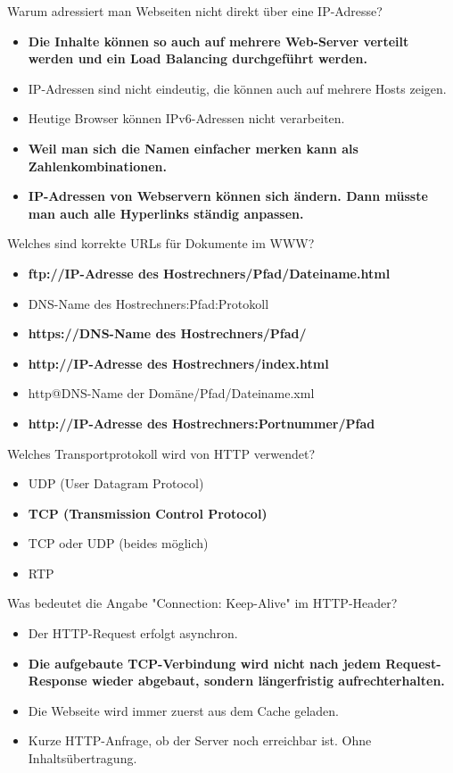 \documentclass{article}
\begin{document}
	Warum adressiert man Webseiten nicht direkt über eine IP-Adresse?
	\begin{itemize}
		\item \textbf{Die Inhalte können so auch auf mehrere Web-Server verteilt werden und ein Load Balancing durchgeführt werden.}
		\item IP-Adressen sind nicht eindeutig, die können auch auf mehrere Hosts zeigen.
		\item Heutige Browser können IPv6-Adressen nicht verarbeiten.
		\item \textbf{Weil man sich die Namen einfacher merken kann als Zahlenkombinationen.}
		\item \textbf{IP-Adressen von Webservern können sich ändern. Dann müsste man auch alle Hyperlinks ständig anpassen.}
	\end{itemize}

	Welches sind korrekte URLs für Dokumente im WWW? 
	\begin{itemize}
		\item \textbf{ftp://IP-Adresse des Hostrechners/Pfad/Dateiname.html}
		\item DNS-Name des Hostrechners:Pfad:Protokoll
		\item \textbf{https://DNS-Name des Hostrechners/Pfad/}
		\item \textbf{http://IP-Adresse des Hostrechners/index.html}
		\item http@DNS-Name der Domäne/Pfad/Dateiname.xml
		\item \textbf{http://IP-Adresse des Hostrechners:Portnummer/Pfad}
	\end{itemize}

	Welches Transportprotokoll wird von HTTP verwendet? 
	\begin{itemize}
		\item UDP (User Datagram Protocol) 
		\item \textbf{TCP (Transmission Control Protocol) }
		\item TCP oder UDP (beides möglich) 
		\item RTP
	\end{itemize}

	Was bedeutet die Angabe "Connection: Keep-Alive" im HTTP-Header? 
	\begin{itemize}
		\item Der HTTP-Request erfolgt asynchron.
		\item \textbf{Die aufgebaute TCP-Verbindung wird nicht nach jedem Request-Response wieder abgebaut, sondern längerfristig aufrechterhalten.} 
		\item Die Webseite wird immer zuerst aus dem Cache geladen. 
		\item Kurze HTTP-Anfrage, ob der Server noch erreichbar ist. Ohne Inhaltsübertragung. 
	\end{itemize}
\end{document}
